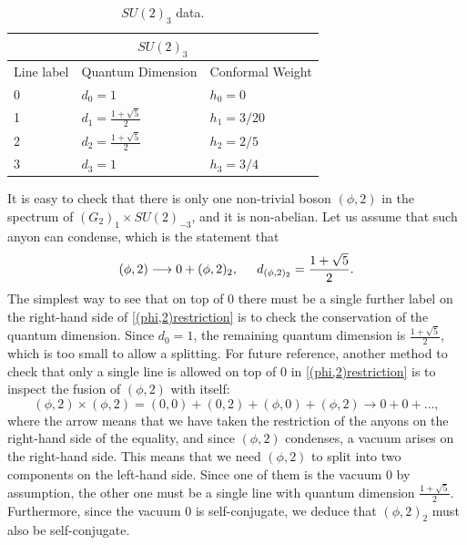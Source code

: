 \documentclass[11pt]{article}
\numberwithin{equation}{section}
\begin{document}
\begin{table}[!b]
\centering
\begin{tabular}[h]{|p{4cm}|p{4cm}|p{4cm}| }
\hline 
\multicolumn{3}{|c|}{$SU(2)_{3}$} \\
\hline
Line label & Quantum Dimension & Conformal Weight \\
\hline
0 & $d_{0} = 1$ & $h_{0}=0$ \\
1 & $d_{1} = \frac{1 + \sqrt{5}}{2}$ & $h_{1}=3/20$ \\
2 & $d_{2} = \frac{1 + \sqrt{5}}{2}$ & $h_{2}=2/5$ \\
3 & $d_{3} = 1$ & $h_{3}=3/4$ \\
\hline
\end{tabular}
\caption{$SU(2)_{3}$ data.}  \label{su2lv3table}
\end{table}

It is easy to check that there is only one non-trivial boson $(\phi,2)$ in the spectrum of $(G_{2})_{1} \times SU(2)_{-3}$, and it is non-abelian. Let us assume that such anyon can condense, which is the statement that
\begin{equation} \label{(phi,2)restriction}
    (\phi,2) \longrightarrow 0 + (\phi,2)_{2}, \hspace{.2in}d_{(\phi,2)_{2}} = \frac{1 + \sqrt{5}}{2}.
\end{equation}
 The simplest way to see that on top of $0$ there must be a single further label on the right-hand side of \eqref{(phi,2)restriction} is to check the conservation of the quantum dimension. Since $d_{0} = 1$, the remaining quantum dimension is $\frac{1+\sqrt{5}}{2}$, which is too small to allow a splitting. For future reference, another method to check that only a single line is allowed on top of $0$ in \eqref{(phi,2)restriction} is to inspect the fusion of $(\phi,2)$ with itself:
\begin{equation}
    (\phi,2) \times (\phi,2)= (0,0) + (0,2) + (\phi,0) + (\phi,2) \longrightarrow 0 + 0 + \ldots,
\end{equation}
where the arrow means that we have taken the restriction of the anyons on the right-hand side of the equality, and since $(\phi,2)$ condenses, a vacuum arises on the right-hand side. This means that we need $(\phi,2)$ to split into two components on the left-hand side. Since one of them is the vacuum 0 by assumption, the other one must be a single line with quantum dimension $\frac{1 + \sqrt{5}}{2}$. Furthermore, since the vacuum $0$ is self-conjugate, we deduce that $(\phi,2)_{2}$ must also be self-conjugate.
\end{document}
